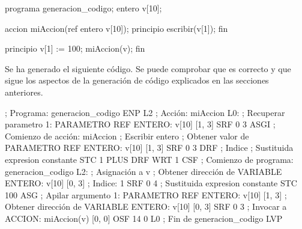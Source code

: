 \begin{codigo}[style=minileng,numbers=left]
programa generacion_codigo;
entero v[10];

accion miAccion(ref entero v[10]);
principio
    escribir(v[1]);
fin

principio
    v[1] := 100;
    miAccion(v);
fin
\end{codigo}

Se ha generado el siguiente código. Se puede comprobar que es correcto y que sigue los aspectos de la generación de código explicados en las secciones anteriores.

\begin{codigo}
; Programa: generacion_codigo
	ENP L2
; Acción: miAccion
L0:
; Recuperar parametro 1: PARAMETRO REF ENTERO:     v[10] [1, 3]
	SRF 0 3
	ASGI
; Comienzo de acción: miAccion
; Escribir entero
; Obtener valor de PARAMETRO REF ENTERO:     v[10] [1, 3]
	SRF 0 3
	DRF
; Indice
; Sustituida expresion constante
	STC 1
	PLUS
	DRF
	WRT 1
	CSF
; Comienzo de programa: generacion_codigo
L2:
; Asignación a v
; Obtener dirección de VARIABLE ENTERO:          v[10] [0, 3]
; Indice: 1
	SRF 0 4
; Sustituida expresion constante
	STC 100
	ASG
; Apilar argumento 1: PARAMETRO REF ENTERO:     v[10] [1, 3]
; Obtener dirección de VARIABLE ENTERO:          v[10] [0, 3]
	SRF 0 3
; Invocar a ACCION:                   miAccion(v) [0, 0]
	OSF 14 0 L0
; Fin de generacion_codigo
	LVP
\end{codigo}
